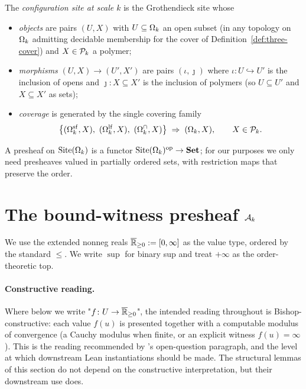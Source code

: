 \begin{definition}
\label{def:site}
The \emph{configuration site at scale $k$} is the Grothendieck site whose
\begin{itemize}
  \item \emph{objects} are pairs $(U, X)$ with $U \subseteq \Omega_k$ an open subset (in any topology on $\Omega_k$ admitting decidable membership for the cover of Definition~\ref{def:three-cover}) and $X \in \mathcal{P}_k$ a polymer;
  \item \emph{morphisms} $(U, X) \to (U', X')$ are pairs $(\iota, \jmath)$ where $\iota \colon U \hookrightarrow U'$ is the inclusion of opens and $\jmath \colon X \subseteq X'$ is the inclusion of polymers (so $U \subseteq U'$ and $X \subseteq X'$ as sets);
  \item \emph{coverage} is generated by the single covering family
  \begin{equation}
    \label{eq:cover}
    \big\{ (\Omega_k^{\mathrm{sf}}, X),\ (\Omega_k^{\mathrm{lf}}, X),\ (\Omega_k^{\cap}, X) \big\} \;\Rightarrow\; (\Omega_k, X), \qquad X \in \mathcal{P}_k.
  \end{equation}
\end{itemize}
\end{definition}

A presheaf on $\mathrm{Site}(\Omega_k)$ is a functor $\mathrm{Site}(\Omega_k)^{\mathrm{op}} \to \mathbf{Set}$; for our purposes we only need presheaves valued in partially ordered sets, with restriction maps that preserve the order.

\section{The bound-witness presheaf $\mathcal{A}_k$}
\label{sec:awitness}

We use the extended nonneg reals $\overline{\mathbb{R}}_{\ge 0} := [0, \infty]$ as the value type, ordered by the standard $\le$.  We write $\sup$ for binary sup and treat $+\infty$ as the order-theoretic top.

\paragraph{Constructive reading.}  Where below we write "$f \colon U \to \overline{\mathbb{R}}_{\ge 0}$", the intended reading throughout is Bishop-constructive: each value $f(u)$ is presented together with a computable modulus of convergence (a Cauchy modulus when finite, or an explicit witness $f(u) = \infty$).  This is the reading recommended by 's open-question paragraph, and the level at which downstream Lean instantiations should be made.  The structural lemmas of this section do not depend on the constructive interpretation, but their downstream use does.

